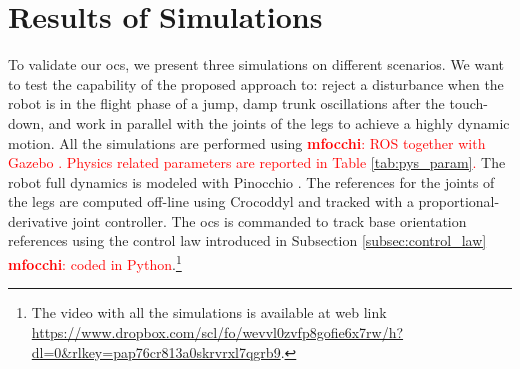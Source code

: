 \documentclass[sensors,article,submit,pdftex,moreauthors]{Definitions/mdpi}
\newcommand{\MF}[1]{\textcolor{red}{\textbf{mfocchi}: #1}}
\begin{document}
\section{Results of Simulations}
\label{sec:simulations}
To validate our \gls{ocs}, we present three simulations on different scenarios. We want to test the capability of the proposed approach to: 
reject a disturbance when the robot is in the flight phase of a jump, damp trunk oscillations after the touch-down, 
and work in parallel with the joints of the legs to achieve a highly dynamic motion. 
All the simulations are performed using \MF{ROS \cite{quigley2009ros} together with Gazebo \cite{koenig2004design}. Physics related parameters are reported in Table \ref{tab:pys_param}.} The robot full dynamics is modeled with Pinocchio \cite{carpentier2019pinocchio}. The references for the joints of the legs are computed off-line using Crocoddyl \cite{mastalli2020crocoddyl} and tracked with a proportional-derivative joint controller. The \gls{ocs} is commanded to  track base orientation references using the control law introduced in Subsection \ref{subsec:control_law} \MF{coded in Python}.\footnote{The video with all the simulations is available at web link \url{https://www.dropbox.com/scl/fo/wevvl0zvfp8gofie6x7rw/h?dl=0&rlkey=pap76cr813a0skrvrxl7qgrb9}.}
\end{document}
